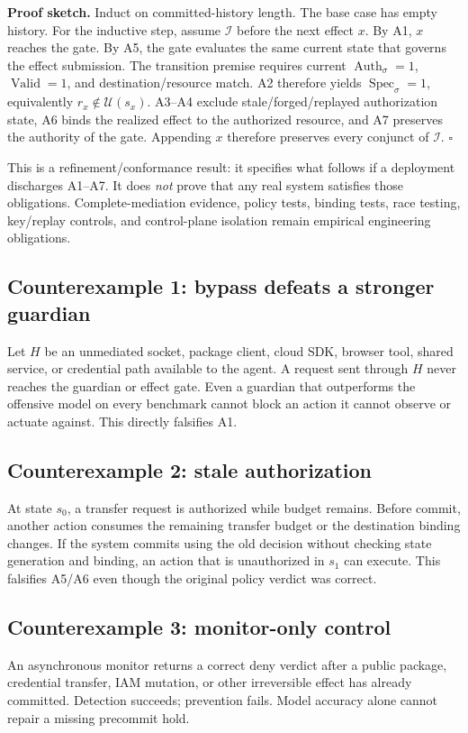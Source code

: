 \documentclass[11pt,letterpaper]{article}
\begin{document}
\textbf{Proof sketch.} Induct on committed-history length. The base case has empty history. For the inductive step, assume $\mathcal{I}$ before the next effect $x$. By A1, $x$ reaches the gate. By A5, the gate evaluates the same current state that governs the effect submission. The transition premise requires current $\operatorname{Auth}_{\sigma}=1$, $\operatorname{Valid}=1$, and destination/resource match. A2 therefore yields $\operatorname{Spec}_{\sigma}=1$, equivalently $r_x\notin\mathcal{U}(s_x)$. A3--A4 exclude stale/forged/replayed authorization state, A6 binds the realized effect to the authorized resource, and A7 preserves the authority of the gate. Appending $x$ therefore preserves every conjunct of $\mathcal{I}$. $\square$

This is a refinement/conformance result: it specifies what follows if a deployment discharges A1--A7. It does \emph{not} prove that any real system satisfies those obligations. Complete-mediation evidence, policy tests, binding tests, race testing, key/replay controls, and control-plane isolation remain empirical engineering obligations.

\subsection{Counterexample 1: bypass defeats a stronger guardian}
Let $H$ be an unmediated socket, package client, cloud SDK, browser tool, shared service, or credential path available to the agent. A request sent through $H$ never reaches the guardian or effect gate. Even a guardian that outperforms the offensive model on every benchmark cannot block an action it cannot observe or actuate against. This directly falsifies A1.

\subsection{Counterexample 2: stale authorization}
At state $s_0$, a transfer request is authorized while budget remains. Before commit, another action consumes the remaining transfer budget or the destination binding changes. If the system commits using the old decision without checking state generation and binding, an action that is unauthorized in $s_1$ can execute. This falsifies A5/A6 even though the original policy verdict was correct.

\subsection{Counterexample 3: monitor-only control}
An asynchronous monitor returns a correct deny verdict after a public package, credential transfer, IAM mutation, or other irreversible effect has already committed. Detection succeeds; prevention fails. Model accuracy alone cannot repair a missing precommit hold.
\end{document}
